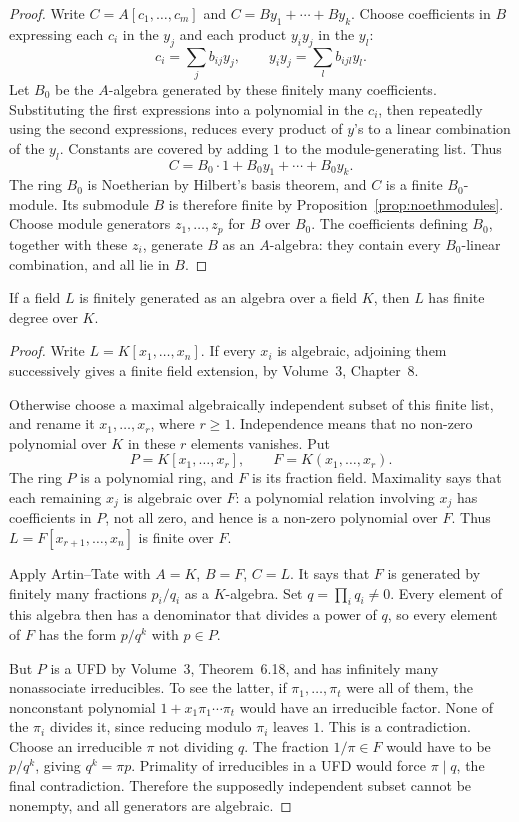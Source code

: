 \begin{proof}
Write $C=A[c_1,\ldots,c_m]$ and $C=By_1+\cdots+By_k$. Choose coefficients in $B$ expressing each $c_i$ in the $y_j$ and each product $y_iy_j$ in the $y_l$:
\[
c_i=\sum_j b_{ij}y_j,\qquad y_iy_j=\sum_l b_{ijl}y_l.
\]
Let $B_0$ be the $A$-algebra generated by these finitely many coefficients. Substituting the first expressions into a polynomial in the $c_i$, then repeatedly using the second expressions, reduces every product of $y$'s to a linear combination of the $y_l$. Constants are covered by adding $1$ to the module-generating list. Thus
\[
C=B_0\cdot1+B_0y_1+\cdots+B_0y_k.
\]
The ring $B_0$ is Noetherian by Hilbert's basis theorem, and $C$ is a finite $B_0$-module. Its submodule $B$ is therefore finite by Proposition~\ref{prop:noethmodules}. Choose module generators $z_1,\ldots,z_p$ for $B$ over $B_0$. The coefficients defining $B_0$, together with these $z_i$, generate $B$ as an $A$-algebra: they contain every $B_0$-linear combination, and all lie in $B$.
\end{proof}

\begin{theorem}\label{thm:zariskilemma}
If a field $L$ is finitely generated as an algebra over a field $K$, then $L$ has finite degree over $K$.
\end{theorem}

\begin{proof}
Write $L=K[x_1,\ldots,x_n]$. If every $x_i$ is algebraic, adjoining them successively gives a finite field extension, by Volume~3, Chapter~8.

Otherwise choose a maximal algebraically independent subset of this finite list, and rename it $x_1,\ldots,x_r$, where $r\ge1$. Independence means that no non-zero polynomial over $K$ in these $r$ elements vanishes. Put
\[
P=K[x_1,\ldots,x_r],\qquad F=K(x_1,\ldots,x_r).
\]
The ring $P$ is a polynomial ring, and $F$ is its fraction field. Maximality says that each remaining $x_j$ is algebraic over $F$: a polynomial relation involving $x_j$ has coefficients in $P$, not all zero, and hence is a non-zero polynomial over $F$. Thus $L=F[x_{r+1},\ldots,x_n]$ is finite over $F$.

Apply Artin--Tate with $A=K$, $B=F$, $C=L$. It says that $F$ is generated by finitely many fractions $p_i/q_i$ as a $K$-algebra. Set $q=\prod_iq_i\ne0$. Every element of this algebra then has a denominator that divides a power of $q$, so every element of $F$ has the form $p/q^k$ with $p\in P$.

But $P$ is a UFD by Volume~3, Theorem~6.18, and has infinitely many nonassociate irreducibles. To see the latter, if $\pi_1,\ldots,\pi_t$ were all of them, the nonconstant polynomial $1+x_1\pi_1\cdots\pi_t$ would have an irreducible factor. None of the $\pi_i$ divides it, since reducing modulo $\pi_i$ leaves $1$. This is a contradiction. Choose an irreducible $\pi$ not dividing $q$. The fraction $1/\pi\in F$ would have to be $p/q^k$, giving $q^k=\pi p$. Primality of irreducibles in a UFD would force $\pi\mid q$, the final contradiction. Therefore the supposedly independent subset cannot be nonempty, and all generators are algebraic.
\end{proof}

